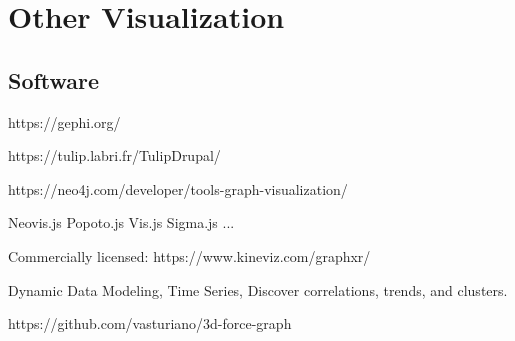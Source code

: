 \documentclass[c,8pt,xcolor...,x11names]{beamer}
\begin{document}
\section{Other Visualization}
\subsection{Software}
\begin{frame}
	https://gephi.org/

	https://tulip.labri.fr/TulipDrupal/
	

https://neo4j.com/developer/tools-graph-visualization/

Neovis.js Popoto.js Vis.js Sigma.js ...

Commercially licensed:
https://www.kineviz.com/graphxr/ 

Dynamic Data Modeling, Time Series, Discover correlations, trends, and clusters.

https://github.com/vasturiano/3d-force-graph



\end{frame}
\end{document}
